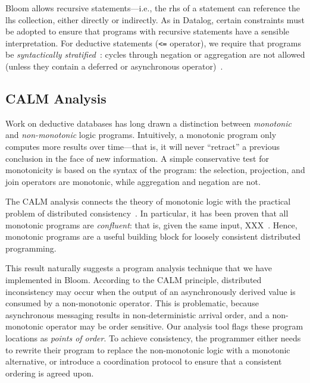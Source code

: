 Bloom allows recursive statements---i.e., the rhs of a statement can reference
the lhs collection, either directly or indirectly. As in Datalog, certain
constraints must be adopted to ensure that programs with recursive statements
have a sensible interpretation. For deductive statements (\verb+<=+ operator),
we require that programs be \emph{syntactically stratified}~\cite{Apt1988}:
cycles through negation or aggregation are not allowed (unless they contain a deferred or asynchronous operator)~\cite{dedalus}.

\subsection{CALM Analysis}
\label{sec:bg-calm}

Work on deductive databases has long drawn a distinction between
\emph{monotonic} and \emph{non-monotonic} logic programs. Intuitively, a
monotonic program only computes more results over time---that is, it will never
``retract'' a previous conclusion in the face of new information. A simple
conservative test for monotonicity is based on the syntax of the program: the
selection, projection, and join operators are monotonic, while aggregation and
negation are not.

The CALM analysis connects the theory of monotonic logic with the practical
problem of distributed consistency~\cite{Alvaro2011}. In particular, it has been
proven that all monotonic programs are \emph{confluent}: that is, given the same
input, XXX~\cite{Ameloot2011}. Hence, monotonic programs are a useful building
block for loosely consistent distributed programming.

This result naturally suggests a program analysis technique that we have
implemented in Bloom. According to the CALM principle, distributed inconsistency
may occur when the output of an asynchronously derived value is consumed by a
non-monotonic operator. This is problematic, because asynchronous messaging
results in non-deterministic arrival order, and a non-monotonic operator may be
order sensitive. Our analysis tool flags these program locations as \emph{points
  of order}. To achieve consistency, the programmer either needs to rewrite
their program to replace the non-monotonic logic with a monotonic alternative, or introduce a coordination
protocol to ensure that a consistent ordering is agreed upon.

